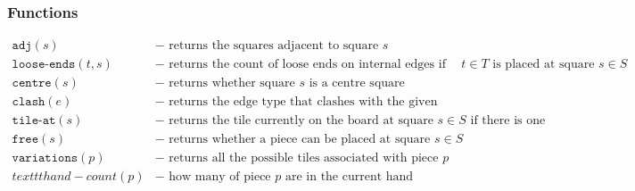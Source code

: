 \documentclass[11pt,a4paper]{article}
\begin{document}
\subsubsection*{Functions}
\begin{align*}
\texttt{adj}(s) &- \textrm{ returns the squares adjacent to square } s \\
\texttt{loose-ends}(t,s) &- \textrm{ returns the count of loose ends on internal edges if tile } t \in T \textrm{ is placed at square } s \in S \\
\texttt{centre}(s) &- \textrm{ returns whether square } s \textrm{ is a centre square} \\
\texttt{clash}(e) &- \textrm{ returns the edge type that clashes with the given edge type} \\
\texttt{tile-at}(s) &- \textrm{ returns the tile currently on the board at square } s \in S \textrm{ if there is one} \\
\texttt{free}(s) &- \textrm{ returns whether a piece can be placed at square } s \in S \\
\texttt{variations}(p) &- \textrm{ returns all the possible tiles associated with piece } p \\
texttt{hand-count}(p) &- \textrm{ how many of piece } p \textrm{ are in the current hand} \\
\end{align*}
\end{document}
